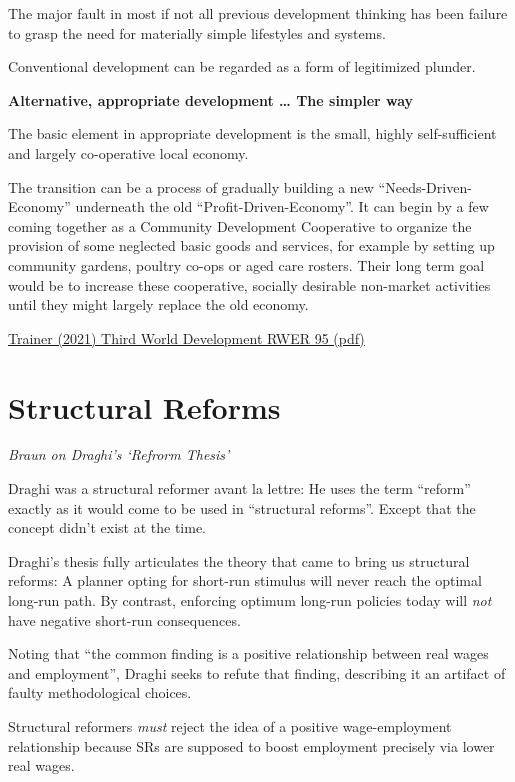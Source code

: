 \documentclass[
]{book}
\begin{document}
The major fault in most if not all previous development thinking has been
failure to grasp the need for materially simple lifestyles and systems.

Conventional development can be regarded as a form of legitimized plunder.

\textbf{Alternative, appropriate development \ldots{} The simpler way}

The basic element in appropriate development is the small, highly self-sufficient
and largely co-operative local economy.

The transition can be a process of gradually building a new ``Needs-Driven-Economy''
underneath the old ``Profit-Driven-Economy''. It can begin by a few coming together as a
Community Development Cooperative to organize the provision of some neglected basic
goods and services, for example by setting up community gardens, poultry co-ops or
aged care rosters. Their long term goal would be to increase these cooperative, socially
desirable non-market activities until they might largely replace the old economy.

\href{Trainer_2021_Third_World_Development.pdf}{Trainer (2021) Third World Development RWER 95 (pdf)}

\hypertarget{structural-reforms}{%
\section{Structural Reforms}\label{structural-reforms}}

\emph{Braun on Draghi's `Refrorm Thesis'}

Draghi was a structural reformer avant la lettre: He uses the term ``reform'' exactly as it would come to be used in ``structural reforms''. Except that the concept didn't exist at the time.

Draghi's thesis fully articulates the theory that came to bring us structural reforms: A planner opting for short-run stimulus will never reach the optimal long-run path. By contrast, enforcing optimum long-run policies today will \emph{not} have negative short-run consequences.

Noting that ``the common finding is a positive relationship between real wages and employment'', Draghi seeks to refute that finding, describing it an artifact of faulty methodological choices.

Structural reformers \emph{must} reject the idea of a positive wage-employment relationship because SRs are supposed to boost employment precisely via lower real wages.
\end{document}
